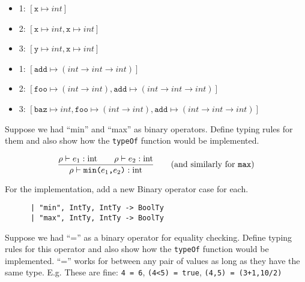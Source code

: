 \documentclass[addpoints]{exam}
\newcommand{\TJDG}[3]{#1 \vdash #2 : #3}
\begin{document}
\begin{questions}
\begin{minipage}{0.65\textwidth}
    \begin{solutionbox}{3cm}
      \begin{itemize}
      \item 1: $[\texttt{x}\mapsto int]$
      \item 2: $[\texttt{x}\mapsto int, \texttt{x}\mapsto int]$
      \item 3: $[\texttt{y}\mapsto int, \texttt{x}\mapsto int]$
      \end{itemize}
    \end{solutionbox}

    \begin{solutionbox}{3cm}
      \begin{itemize}
      \item 1: $[\texttt{add}\mapsto (int \to int \to int)]$
      \item 2: $[\texttt{foo}\mapsto (int \to int), \texttt{add}\mapsto (int \to int \to int)]$
      \item 3: $[\texttt{baz} \mapsto int, \texttt{foo}\mapsto (int \to int), \texttt{add}\mapsto (int \to int \to int)]$
      \end{itemize}
    \end{solutionbox}
  \end{minipage}

  
  \question
  Suppose we had ``min'' and ``max'' as binary operators.
  Define typing rules for them and
  also show how the \texttt{typeOf} function would be implemented.

  \begin{solutionbox}{4cm}
    \[
    \frac{\TJDG{\rho}{e_1}{\mathrm{int}} \qquad \TJDG{\rho}{e_2}{\mathrm{int}}}
         {\TJDG{\rho}{\texttt{min($e_1$,$e_2$)}}{\mathrm{int}}}
         \qquad \textrm{(and similarly for \texttt{max})}
    \]

    For the implementation, add a new Binary operator case for each.

    \begin{verbatim}
      | "min", IntTy, IntTy -> BoolTy
      | "max", IntTy, IntTy -> BoolTy
    \end{verbatim}
  \end{solutionbox}
  
  \question
  Suppose we had ``='' as a binary operator for equality checking.
  Define typing rules for this operator and
  also show how the \texttt{typeOf} function would be implemented.
  ``='' works for between any pair of values as long as they have the same type.
  E.g. These are fine: \texttt{4 = 6}, \texttt{(4<5) = true}, \texttt{(4,5) = (3+1,10/2)}


\end{questions}
\end{document}

